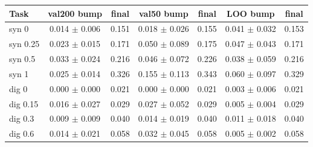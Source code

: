 \begin{tabular}{lcccccc}\hline
Task & val200 bump & final & val50 bump & final & LOO bump & final \\ \hline
syn 0 & 0.014 $\pm$ 0.006 & 0.151 & 0.018 $\pm$ 0.026 & 0.155 & 0.041 $\pm$ 0.032 & 0.153 \\
syn 0.25 & 0.023 $\pm$ 0.015 & 0.171 & 0.050 $\pm$ 0.089 & 0.175 & 0.047 $\pm$ 0.043 & 0.171 \\
syn 0.5 & 0.033 $\pm$ 0.024 & 0.216 & 0.046 $\pm$ 0.072 & 0.226 & 0.038 $\pm$ 0.059 & 0.216 \\
syn 1 & 0.025 $\pm$ 0.014 & 0.326 & 0.155 $\pm$ 0.113 & 0.343 & 0.060 $\pm$ 0.097 & 0.329 \\
dig 0 & 0.000 $\pm$ 0.000 & 0.021 & 0.000 $\pm$ 0.000 & 0.021 & 0.003 $\pm$ 0.006 & 0.021 \\
dig 0.15 & 0.016 $\pm$ 0.027 & 0.029 & 0.027 $\pm$ 0.052 & 0.029 & 0.005 $\pm$ 0.004 & 0.029 \\
dig 0.3 & 0.009 $\pm$ 0.009 & 0.040 & 0.014 $\pm$ 0.019 & 0.040 & 0.011 $\pm$ 0.018 & 0.040 \\
dig 0.6 & 0.014 $\pm$ 0.021 & 0.058 & 0.032 $\pm$ 0.045 & 0.058 & 0.005 $\pm$ 0.002 & 0.058 \\
\hline\end{tabular}
